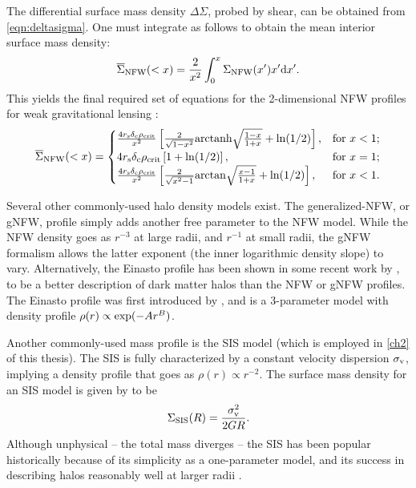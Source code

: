 The differential surface mass density $\Delta\Sigma$, probed by shear, can be obtained from  \autoref{eqn:deltasigma}. One must integrate as follows to obtain the mean interior surface mass density:
\begin{equation}
\overline{\Sigma}_{\rm NFW}(<x) = \frac{2}{x^2} \int_0^{x} \Sigma_{\rm NFW}(x') x' {\rm d}x'.
\end{equation}
This yields the final required set of equations for the 2-dimensional \ac{NFW} profiles for weak gravitational lensing \citep{Wright00}:
\begin{equation}
\overline{\Sigma}_{\rm NFW}(<x) = 
    \begin{cases}
        \frac{4 r_{\rm s} \delta_{\rm c} \rho_{\rm crit}}{x^2} \left[ \frac{2}{\sqrt{1-x^2}} {\rm arctanh} \sqrt{\frac{1-x}{1+x}} + {\rm ln}(1/2) \right], & \text{for } x < 1; \\
        4 r_{\rm s} \delta_{\rm c} \rho_{\rm crit} \left[ 1 + {\rm ln}(1/2) \right], & \text{for } x = 1; \\
        \frac{4 r_{\rm s} \delta_{\rm c} \rho_{\rm crit}}{x^2} \left[ \frac{2}{\sqrt{x^2 - 1}} {\rm arctan} \sqrt{\frac{x-1}{1+x}} + {\rm ln}(1/2) \right], & \text{for } x < 1.
    \end{cases}
\end{equation}

Several other commonly-used halo density models exist. The generalized-\ac{NFW}, or g\ac{NFW}, profile simply adds another free parameter to the \ac{NFW} model. While the \ac{NFW} density goes as $r^{-3}$ at large radii, and $r^{-1}$ at small radii, the g\ac{NFW} formalism allows the latter exponent (the inner logarithmic density slope) to vary. Alternatively, the Einasto profile has been shown in some recent work by \citet{Dutton14}, to be a better description of dark matter halos than the \ac{NFW} or g\ac{NFW} profiles. The Einasto profile was first introduced by \citet{Einasto65}, and is a 3-parameter model with density profile $\rho(r) \propto {\rm exp}(-Ar^{B})$.

Another commonly-used mass profile is the \ac{SIS} model (which is employed in \autoref{ch2} of this thesis). The \ac{SIS} is fully characterized by a constant velocity dispersion $\sigma_{\rm v}$, implying a density profile that goes as $\rho(r) \propto r^{-2}$. The surface mass density for an \ac{SIS} model is given by \citet{BS01} to be
\begin{equation}
\Sigma_{\rm SIS}(R) = \frac{\sigma_{\rm v}^2}{2 G R}.
\end{equation}
Although unphysical -- the total mass diverges -- the \ac{SIS} has been popular historically because of its simplicity as a one-parameter model, and its success in describing halos reasonably well at larger radii \citep{Schneider06_WeakGravLens}.

